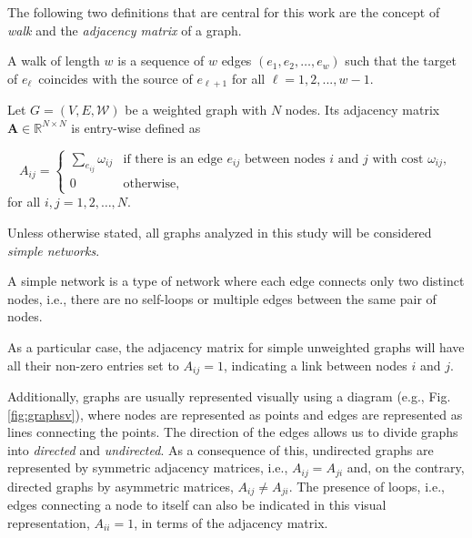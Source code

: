 The following two definitions that are central for this work are the concept of \textit{walk} and the \textit{adjacency matrix} of a graph.  

\begin{definition}
    A walk of length $w$ is a sequence of $w$ edges $(e_1, e_2, \dots, e_w)$ such that the target of $e_\ell$ coincides with the source of $e_{\ell+1}$ for all $\ell=1, 2, ..., w−1$.
\end{definition}
  
\begin{definition}
	Let $G =(V, E, \mathcal{W})$ be a weighted graph with $N$ nodes. Its adjacency matrix $\mathbf{A}\in\mathbb{R}^{N\times N}$ is entry-wise defined as
 
 \begin{equation}
  A_{ij} =
    \begin{cases}
      \sum_{e_{ij}}\omega_{ij} & \text{if there is an edge $e_{ij}$ between nodes $i$ and $j$ with cost $\omega_{ij}$},\\
      0 & \text{otherwise},
    \end{cases}       
\end{equation}
for all $i, j = 1,2,\dots, N$.
\end{definition}

Unless otherwise stated, all graphs analyzed in this study will be considered \textit{simple networks}.

\begin{definition}
    A simple network is a type of network where each edge connects only two distinct nodes, i.e., there are no self-loops or multiple edges between the same pair of nodes. 
\end{definition}
As a particular case, the adjacency matrix for simple unweighted graphs will have all their non-zero entries set to $A_{ij}=1$, indicating a link between nodes $i$ and $j$.

Additionally, graphs are usually represented visually using a diagram (e.g., Fig. \ref{fig:graphsv}), where nodes are represented as points and edges are represented as lines connecting the points. The direction of the edges allows us to divide graphs into \textit{directed} and \textit{undirected}. As a consequence of this, undirected graphs are represented by symmetric adjacency matrices, i.e., $A_{ij}=A_{ji}$ and, on the contrary, directed graphs by asymmetric matrices, $A_{ij}\ne A_{ji}$. The presence of loops, i.e., edges connecting a node to itself can also be indicated in this visual representation, $A_{ii} = 1$, in terms of the adjacency matrix.

